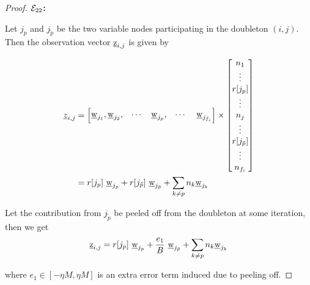 \begin{proof}
	
	{\bf $\mathcal{E}_{22}$:}
	
	Let $j_p$ and $j_{\tilde{p}}$ be the two variable nodes participating in the doubleton $(i,j)$. Then the observation vector $\underline{\mathrm{z}}_{i,j}$ is given by 
	
	\begin{align*}
		\underline{z}_{i,j} &= \begin{bmatrix}
			\underline{\mathrm{w}}_{j_{1}},\underline{\mathrm{w}}_{j_2}, & \cdots   & \underline{\mathrm{w}}_{j_p}, &\cdots \ &\underline{\mathrm{w}}_{j_{f_i}}
		\end{bmatrix} \times
		\begin{bmatrix}
			n_{1} \\
			\vdots \\
			r[j_p]\\
			\vdots\\
			n_{j} \\
			\vdots\\
			r[j_{\tilde{p}}]\\
			\vdots\\
			n_{f_i}\\
		\end{bmatrix}\\
		&= r[j_p] ~ \underline{\mathrm{w}}_{j_p} + r[j_{\tilde{p}}] ~ \underline{\mathrm{w}}_{j_{\tilde{p}}} + \sum_{k \neq p}n_k \underline{\mathrm{w}}_{j_k} \\
	\end{align*}
	
	Let the contribution from $j_{\tilde{p}}$ be peeled off from the doubleton at some iteration, then we get
	\[ \underline{\mathrm{z}}_{i,j} = r[j_p] ~ \underline{\mathrm{w}}_{j_p} + \frac{e_1}{B} ~ \underline{\mathrm{w}}_{j_{\tilde{p}}} + \sum_{k \neq p}n_k \underline{\mathrm{w}}_{j_k}\]
	
	where $e_1 \in[-\eta M, \eta M]$ is an extra error term induced due to peeling off.
	

\end{proof}
